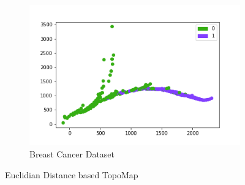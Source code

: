 \documentclass[11pt, a4paper]{article}
\begin{document}
\begin{figure}[h]
\begin{subfigure}[b]{0.3\textwidth}
            \includegraphics[width=\textwidth]{breast_cancer_euclidian_distance_1.png}
            \caption{Breast Cancer Dataset}
            \label{breast_cancer_euclid}
        \end{subfigure}
            \caption{Euclidian Distance based TopoMap}
            \label{euclid}
    \end{figure}
\end{document}
